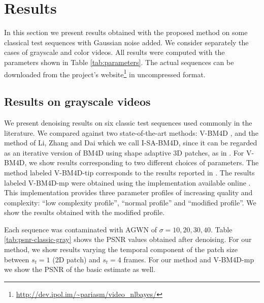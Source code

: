 \documentclass[10pt, a4paper]{article}
\begin{document}
%

%


\section{Results}
\label{sec:results}

In this section we present results obtained with the proposed
method on some classical test sequences with Gaussian noise added.
We consider separately the cases of grayscale and color videos.
All results were computed with the parameters shown in Table \ref{tab:parameters}.
The actual sequences can be downloaded from the project's
website\footnote{\url{http://dev.ipol.im/~pariasm/video_nlbayes/}} in uncompressed format.


\subsection{Results on grayscale videos}

We present denoising results on six classic test sequences used commonly in the
literature. We compared against two state-of-the-art methods: V-BM4D
\cite{Maggioni2012}, and the method of Li, Zhang and Dai \cite{LiZhangDai2011}
which we call I-SA-BM4D, since it can be regarded as an iterative version of BM4D \cite{Maggioni2013}
using shape adaptive 3D patches, as in \cite{Ercole2005}.  
For V-BM4D, we show results corresponding to two
different choices of parameters. The method labeled V-BM4D-tip
corresponds to the results reported
in \cite{Maggioni2012}. The results labeled V-BM4D-mp were
obtained using the implementation available online \cite{bm4dcode}. This
implementation provides three parameter profiles of increasing quality and
complexity: ``low complexity profile'', ``normal profile'' and ``modified
profile''. We show the results obtained with the modified profile.

Each sequence was contaminated with AGWN of $\sigma =
10,20,30,40$. Table \ref{tab:psnr-classic-gray} shows the
PSNR values obtained after denoising. For our method, we show results varying the temporal
component of the patch size between $s_t = 1$ (2D patch) and $s_t = 4$ frames.
For our method and V-BM4D-mp we show the PSNR of the basic estimate as well.
\end{document}
